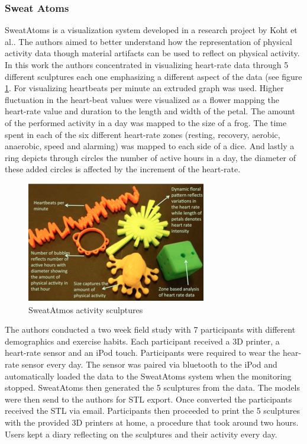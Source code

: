 \documentclass[../medieninformatik-arbeit.tex]{subfiles}
\begin{document}
\subsubsection{Sweat Atoms}
SweatAtoms is a visualization system developed in a research project by Koht et al.\cite{khot2014understanding}. The authors aimed to better understand how the representation of physical activity data though material artifacts can be used to reflect on physical activity. 
In this work the authors concentrated in visualizing heart-rate data through 5 different sculptures each one emphasizing a different aspect of the data (see figure \ref{fig:sweatatmos-as}. For visualizing heartbeats per minute an extruded graph was used. Higher fluctuation in the heart-beat values were visualized as a flower mapping the heart-rate value and duration to the length and width of the petal. The amount of the performed activity in a day was mapped to the size of a frog. The time spent in each of the six different heart-rate zones (resting, recovery, aerobic, anaerobic, speed and alarming) was mapped to each side of a dice. And lastly a ring depicts through circles the number of active hours in a day, the diameter of these added circles is affected by the increment of the heart-rate. 

\begin{figure}[ht]
\begin{center}
  \includegraphics[width=0.7\textwidth]{RelatedWork/img/sweatatoms-as}
  \caption{SweatAtmos activity sculptures\cite{khot2014understanding}}
\label{fig:sweatatmos-as}
\end{center}
\end{figure}

The authors conducted a two week field study with 7 participants with different demographics and exercise habits. Each participant received a 3D printer, a heart-rate sensor and an iPod touch. Participants were required to wear the hear-rate sensor every day. The sensor was paired via bluetooth to the iPod and automatically loaded the data to the SweatAtoms system when the monitoring stopped. SweatAtoms then generated the 5 sculptures from the data. The models were then send to the authors for STL export. Once converted the participants received the STL via email. Participants then proceeded to print the 5 sculptures with the provided 3D printers at home, a procedure that took around two hours. Users kept a diary reflecting on the sculptures and their activity every day. 
\end{document}
